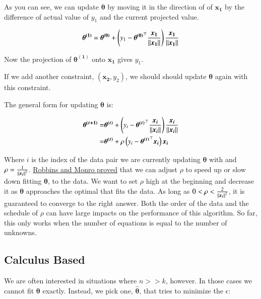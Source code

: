 \documentclass{article}
\DeclarePairedDelimiter\norm{\lVert}{\rVert}%
\begin{document}
As you can see, we can update $\boldsymbol{\theta}$ by moving it in the direction of of $\boldsymbol{x_1}$ by the difference of actual value of $y_1$ and the current projected value.

$$
 \boldsymbol{\theta^{(1)}} = \boldsymbol{\theta^{(0)}} + \left( y_1 -  \boldsymbol{\theta^{(0)}}^{\top} \frac{ \boldsymbol{x_1}}{\norm*{\boldsymbol{x_1}}} \right) \frac{ \boldsymbol{x_1}}{\norm*{\boldsymbol{x_1}}}
$$

Now the projection of $\boldsymbol{\theta^{(1)}}$ onto $\boldsymbol{x_1}$ gives $y_1$.


If we add another constraint, $\left(\boldsymbol{x_2}, y_2\right)$, we should should update $\boldsymbol{\theta}$ again with this constraint.

The general form for updating $\boldsymbol{\theta}$ is:


\begin{align*}
 \boldsymbol{\theta^{(t+1)}} = & \boldsymbol{\theta^{(t)}} + \left( y_i -  \boldsymbol{\theta^{(t)}}^{\top} \frac{ \boldsymbol{x_i}}{\norm*{\boldsymbol{x_i}}} \right) \frac{ \boldsymbol{x_i}}{\norm*{\boldsymbol{x_i}}} \\
  = & \boldsymbol{\theta^{(t)}} + \rho \left( y_i -  \boldsymbol{\theta^{(t)}}^{\top} \boldsymbol{x_i} \right) \boldsymbol{x_i} \\
\end{align*}

Where $i$ is the index of the data pair we are currently updating  $\boldsymbol{\theta}$ with and $\rho=\frac{1}{\norm*{\boldsymbol{x_i}}^2}$. \href{https://en.wikipedia.org/wiki/Stochastic_approximation#Robbins.E2.80.93Monro_algorithm}{Robbins and Monro proved} that we can adjust $\rho$ to speed up or slow down fitting $\boldsymbol{\theta}$, to the data. We want to set $\rho$ high at the beginning and decrease it as $\boldsymbol{\theta}$ approaches the optimal that fits the data. As long as $0<\rho<\frac{2}{\norm*{\boldsymbol{x_i}}^2}$, it is guaranteed to converge to the right answer. Both the order of the data and the schedule of $\rho$ can have large impacts on the performance of this algorithm. So far, this only works when the number of equations is equal to the number of unknowns.

\subsection{Calculus Based}

We are often interested in situations where $n >> k$, however. In those cases we cannot fit $\boldsymbol{\theta}$ exactly. Instead, we pick one, $\boldsymbol{\hat{\theta}}$,  that tries to minimize the $\epsilon$:
\end{document}
